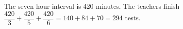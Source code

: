 The seven-hour interval is 420 minutes. The teachers finish $\dfrac{420}{3}+\dfrac{420}{5}+\dfrac{420}{6}=140+84+70=\boxed{294}$ tests.
